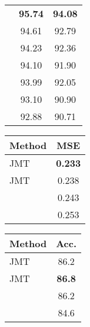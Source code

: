 \documentclass[11pt,a4paper]{article}
\begin{document}
\begin{table*}[t!]
\begin{minipage}[t]{.35\textwidth}
\begin{center}
{\begin{tabular}{l|cc}
	\citet{biaffine2017} & {\bf 95.74} & {\bf 94.08} \\
	\citet{andor2016} &  94.61 & 92.79  \\
	\citet{alberti2016} & 94.23 & 92.36 \\
    \citet{zhang2017head} & 94.10 & 91.90 \\
    \citet{weiss2015dep} & 93.99 & 92.05 \\
    \citet{dyer2015dep} & 93.10 & 90.90 \\
    \citet{bohnet:2010dep} & 92.88 & 90.71 \\ \hline
  \end{tabular}
}
    \caption{Dependency results.}
    \label{table:dep}
  \end{center}
\end{minipage}

\end{table*}


\begin{table*}[t!]

\begin{minipage}[t]{.45\textwidth}
  \begin{center}
{\scriptsize
	\begin{tabular}{l|c}
    Method   & MSE  \\ \hline
	JMT &  {\bf 0.233}  \\
    JMT &  0.238  \\ \hline
	\citet{zhou2016coling} &  0.243  \\
    \citet{tai2015treelstm} & 0.253 \\ \hline
  \end{tabular}
}
    \caption{Semantic relatedness results.}
    \label{table:relate}
  \end{center}
\end{minipage}
\hfill
\begin{minipage}[t]{.45\textwidth}
  \begin{center}
{\scriptsize
	\begin{tabular}{l|c}
    Method   & Acc.  \\ \hline
	JMT &  86.2  \\
	JMT &  {\bf 86.8}  \\ \hline
	\citet{yin2016abcnn} &  86.2  \\
    \citet{lai2014semeval} & 84.6 \\ \hline
  \end{tabular}
}
    \caption{Textual entailment results.}
    \label{table:entail}
  \end{center}
\end{minipage}
  
\end{table*}
\end{document}
